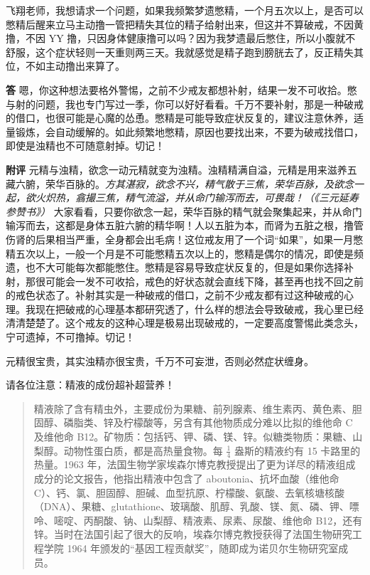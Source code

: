 \begin{case}
    飞翔老师，我想请求一个问题，如果我频繁梦遗憋精，一个月五次以上，是否可以憋精后醒来立马主动撸一管把精失其位的精子给射出来，但这并不算破戒，不因黄撸，不因 YY 撸，只因身体健康撸可以吗？因为我梦遗最后憋住，所以小腹就不舒服，这个症状轻则一天重则两三天。我就感觉是精子跑到膀胱去了，反正精失其位，不如主动撸出来算了。

    \textbf{答} 嗯，你这种想法要格外警惕，之前不少戒友都想补射，结果一发不可收拾。憋与射的问题，我也专门写过一季，你可以好好看看。千万不要补射，那是一种破戒的借口，也很可能是心魔的怂恿。憋精是可能导致症状反复的，建议注意休养，适量锻炼，会自动缓解的。如此频繁地憋精，原因也要找出来，不要为破戒找借口，即使是浊精也不可随意射掉。切记！

    \textbf{附评} 元精与浊精，欲念一动元精就变为浊精。浊精精满自溢，元精是用来滋养五藏六腑，荣华百脉的。\textit{方其湛寂，欲念不兴，精气散于三焦，荣华百脉，及欲念一起，欲火炽热，翕撮三焦，精气流溢，并从命门输泻而去，可畏哉！（《三元延寿参赞书》）} 大家看看，只要你欲念一起，荣华百脉的精气就会聚集起来，并从命门输泻而去，这都是身体五脏六腑的精华啊！人以五脏为本，而肾为五脏之根，撸管伤肾的后果相当严重，全身都会出毛病！这位戒友用了一个词“如果”，如果一月憋精五次以上，一般一个月是不可能憋精五次以上的，憋精是偶尔的情况，即使是频遗，也不大可能每次都能憋住。憋精是容易导致症状反复的，但是如果你选择补射，那很可能会一发不可收拾，戒色的好状态就会直线下降，甚至再也找不回之前的戒色状态了。补射其实是一种破戒的借口，之前不少戒友都有过这种破戒的心理。我现在把破戒的心理基本都研究透了，什么样的想法会导致破戒，我心里已经清清楚楚了。这个戒友的这种心理是极易出现破戒的，一定要高度警惕此类念头，宁可遗掉，不可撸掉。切记！

    元精很宝贵，其实浊精亦很宝贵，千万不可妄泄，否则必然症状缠身。

    请各位注意：精液的成份超补超营养！

    \begin{quote}
        精液除了含有精虫外，主要成份为果糖、前列腺素、维生素丙、黄色素、胆固醇、磷脂类、锌及柠檬酸等，另含有其他物质成分难以比拟的维他命 C 及维他命 B12。矿物质：包括钙、钾、磷、镁、锌。似糖类物质：果糖、山梨醇。动物性蛋白质，都是高热量食物。每 $\frac{1}{4}$ 盎斯的精液约有 15 卡路里的热量。1963 年，法国生物学家埃森尔博克教授提出了更为详尽的精液组成成分的论文报告，他指出精液中包含了 aboutonia、抗坏血酸（维他命 C）、钙、氯、胆固醇、胆碱、血型抗原、柠檬酸、氨酸、去氧核塘核酸（DNA）、果糖、glutathione、玻璃酸、肌醇、乳酸、镁、氮、磷、钾、嘌呤、嘧啶、丙酮酸、钠、山梨醇、精液素、尿素、尿酸、维他命 B12，还有锌。当时在法国引起了很大的反响，埃森尔博克教授获得了法国生物研究工程学院 1964 年颁发的“基因工程贡献奖”，随即成为诺贝尔生物研究室成员。
    \end{quote}
\end{case}

